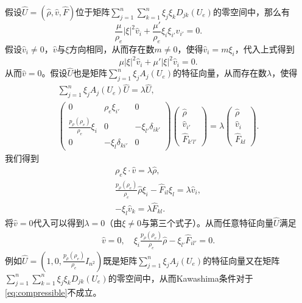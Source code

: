 假设$\hat{U} = (\hat{\rho}, \hat{ v },\hat{F})$位于矩阵$\sum_{j=1}^n \sum_{k=1}^n  \xi_j \xi_k D_{jk}(U_e)$的零空间中，那么有
\begin{equation*}
    \frac{\mu}{\rho_e} |\xi|^2 \hat{v}_i + \frac{\mu'}{\rho_e} \xi_i \xi_{i'} \hat{v}_{i'} = 0.
\end{equation*}
假设$\hat{v}_{i} \neq 0$，$\hat{v}$与$\xi$方向相同，从而存在数$m \neq 0$，使得$\hat{v}_i = m \xi_i$，代入上式得到
\begin{equation*}
    \mu |\xi|^2 \hat{v}_i + \mu' |\xi|^2 \hat{v}_i = 0. 
\end{equation*}
从而$\hat{v}=0$。假设$\hat{U}$也是矩阵$ \sum_{j=1}^n \xi_j A_j(U_e)$的特征向量，从而存在数$\lambda$，使得
\begin{eqnarray*}
    \sum_{j=1}^n \xi_j A_j(U_e)\hat{U} = \lambda \hat{U}, \\
     \left( \begin{array}{ccc} 0 & \rho_e \xi_{i'} & 0 \\
    \frac{p_\rho(\rho_e)}{\rho_e} \xi_i & 0 & -\xi_{l'} \delta_{ik'} \\
    0 & - \xi_{l}\delta_{ki'}  & 0 \end{array} \right)
    \left(\begin{array}{c}
        \hat{\rho} \\ \hat{ v}_{i'} \\ \hat{F}_{k'l'}
    \end{array} \right) = \lambda
    \left(\begin{array}{c}
        \hat{\rho} \\ \hat{ v }_i \\ \hat{F}_{kl}
    \end{array} \right).
\end{eqnarray*}
我们得到
\begin{eqnarray*}
    \rho_e \xi \cdot \hat{v}  = \lambda \hat{\rho} , \\
    \frac{p_\rho(\rho_e)}{\rho_e} \hat{\rho} \xi_i - \hat{F}_{il} \xi_l = \lambda \hat{v}_i, \\
    -\xi_l \hat{v}_k = \lambda \hat{F}_{kl}.
\end{eqnarray*}
将$\hat{v}=0$代入可以得到$\lambda = 0$（由$\xi \neq 0$与第三个式子）。从而任意特征向量$\hat{U}$满足
\begin{eqnarray} \label{eq:linear}
    \hat{ v }=0, \quad \xi_i \frac{p_\rho(\rho_e)}{\rho_e} \hat{\rho} - \xi_{l'} \hat{F}_{il'} = 0.
\end{eqnarray}
例如$\hat{U} = (1,0,\frac{p_\rho(\rho_e)}{\rho_e} I_{n^2})$既是矩阵$ \sum_{j=1}^n \xi_j A_j(U_e)$的特征向量又在矩阵$\sum_{j=1}^n \sum_{k=1}^n \xi_j \xi_k D_{jk}(U_e)$的零空间中，从而Kawashima条件对于\eqref{eq:compressible}不成立。

